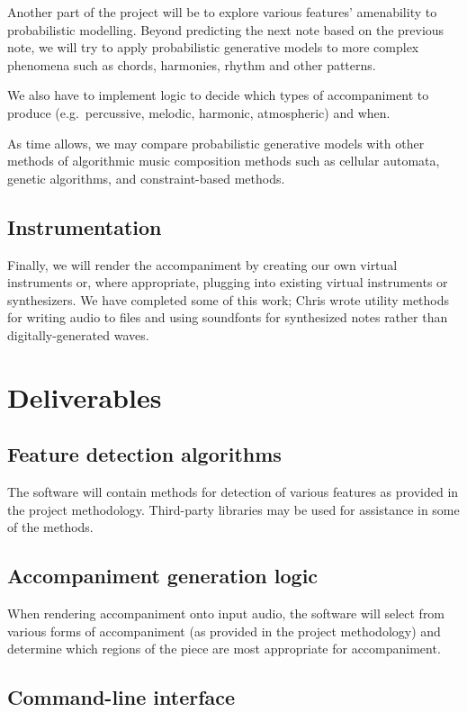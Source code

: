 \documentclass[11pt,conference,letterpaper]{IEEEtran}
\begin{document}
Another part of the project will be to explore various features’ amenability to probabilistic modelling. Beyond predicting the next note based on the previous note, we will try to apply probabilistic generative models to more complex phenomena such as chords, harmonies, rhythm and other patterns.

We also have to implement logic to decide which types of accompaniment to produce (e.g.\ percussive, melodic, harmonic, atmospheric) and when.

As time allows, we may compare probabilistic generative models with other methods of algorithmic music composition methods such as cellular automata, genetic algorithms, and constraint-based methods.

\subsection{Instrumentation}

Finally, we will render the accompaniment by creating our own virtual instruments or, where appropriate, plugging into existing virtual instruments or synthesizers. We have completed some of this work; Chris wrote utility methods for writing audio to files and using soundfonts for synthesized notes rather than digitally-generated waves.

\section{Deliverables}

\subsection{Feature detection algorithms}

The software will contain methods for detection of various features as provided in the project methodology. Third-party libraries may be used for assistance in some of the methods.

\subsection{Accompaniment generation logic}

When rendering accompaniment onto input audio, the software will select from various forms of accompaniment (as provided in the project methodology) and determine which regions of the piece are most appropriate for accompaniment.

\subsection{Command-line interface}
\end{document}
